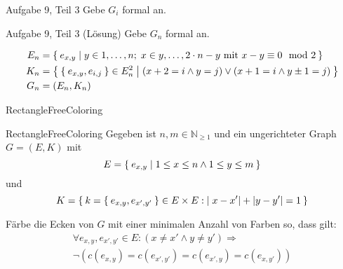 \begin{frame}{Aufgabe 9, Teil 3}
Gebe $G_i$ formal an.

\begin{gallery}
\end{gallery}
\end{frame}

\begin{frame}{Aufgabe 9, Teil 3 (Lösung)}
Gebe $G_n$ formal an.

\begin{gallery}
\end{gallery}

\begin{align*}
    E_n &= \Set{e_{x,y} | y \in 1, \dots, n;\; x \in y, \dots, 2 \cdot n - y \text{ mit } x-y \equiv 0 \mod 2}\\
    K_n &= \Set{\Set{e_{x,y}, e_{i,j}} \in E_n^2 | (x+2=i \land y=j) \lor (x+1=i \land y\pm1=j)}\\
    G_n &= (E_n, K_n)
\end{align*}

\end{frame}

\begin{frame}{{\sc RectangleFreeColoring}}
    \begin{block}{{\sc RectangleFreeColoring}}
        Gegeben ist $n, m \in \mathbb{N}_{\geq 1}$ und ein
        ungerichteter Graph $G = (E, K)$ mit
            \[E = \Set{e_{x,y} | 1 \leq x \leq n \land 1 \leq y \leq m}\]
        und
            \[K = \Set{k=\Set{e_{x,y}, e_{x',y'}} \in E \times E : |x-x'| + |y-y'| = 1} \]

        Färbe die Ecken von $G$ mit einer minimalen Anzahl von Farben so, dass gilt:
		\begin{align*}
			\forall e_{x,y}, e_{x',y'} \in E: (x \neq x' \land y \neq y') \Rightarrow\\
			\neg \left (c(e_{x,y}) = c(e_{x',y'}) = c(e_{x',y}) = c(e_{x,y'}) \right )
		\end{align*}
    \end{block}
\end{frame}


